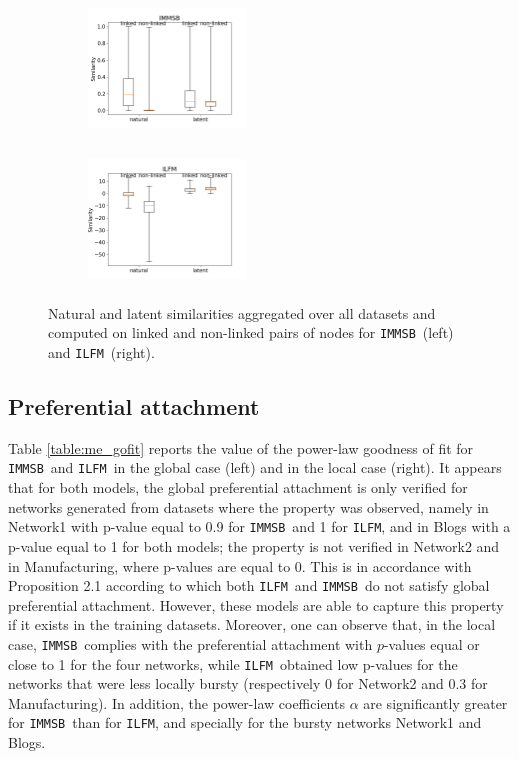 \documentclass{llncs}
\newcommand{\ifm}{\texttt{ILFM}}
\newcommand{\imb}{\texttt{IMMSB}}
\begin{document}
\begin{figure}[ht]
\centering
    \begin{subfigure}
       	 \centering
        	 \includegraphics[width=4.22cm,height=3.5cm]{img/corpus/homo_mustach_immsb}
    \end{subfigure}
    \begin{subfigure}
        	 \centering
          \includegraphics[width=4.22cm,height=3.5cm]{img/corpus/homo_mustach_ilfm}
    \end{subfigure}
    \caption{Natural and latent similarities aggregated over all datasets and computed on linked and non-linked pairs of nodes for \imb\ (left) and \ifm\ (right).}
    \label{fig:homo_mustach}
\end{figure}

\subsection{Preferential attachment}

Table \ref{table:me_gofit} reports the value of the power-law goodness of fit for \imb\ and \ifm\ in the global case (left) and in the local case (right). It appears that for both models, the global preferential attachment is only verified for networks generated from datasets where the property was observed, namely in Network1 with p-value equal to 0.9 for \imb\ and 1 for \ifm, and in Blogs with a p-value equal to 1 for both models; the property is not verified in Network2 and in Manufacturing, where p-values are equal to 0. This is in accordance with Proposition 2.1 according to which both \ifm\ and \imb\ do not satisfy global preferential attachment. However, these models are able to capture this property if it exists in the training datasets.  Moreover, one can observe that, in the local case, \imb\ complies with the preferential attachment with $p$-values equal or close to 1 for the four networks, while \ifm\ obtained low p-values for the networks that were less locally bursty (respectively  0  for Network2 and 0.3 for Manufacturing). In addition, the power-law coefficients $\alpha$ are significantly greater for \imb\ than for \ifm, and specially for the bursty networks Network1 and Blogs.
\end{document}
